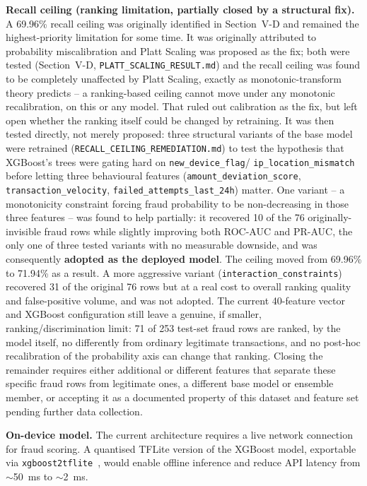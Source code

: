 \documentclass[conference]{IEEEtran}
\begin{document}
\textbf{Recall ceiling (ranking limitation, partially closed by a structural
fix).} A 69.96\% recall ceiling was originally identified in Section~V-D and
remained the highest-priority limitation for some time. It was originally
attributed to probability miscalibration and Platt Scaling was proposed as
the fix; both were tested (Section~V-D, \texttt{PLATT\_SCALING\_RESULT.md})
and the recall ceiling was found to be completely unaffected by Platt
Scaling, exactly as monotonic-transform theory predicts -- a ranking-based
ceiling cannot move under any monotonic recalibration, on this or any
model. That ruled out calibration as the fix, but left open whether the
ranking itself could be changed by retraining. It was then tested directly,
not merely proposed: three structural variants of the base model were
retrained (\texttt{RECALL\_CEILING\_REMEDIATION.md}) to test the hypothesis
that XGBoost's trees were gating hard on \texttt{new\_device\_flag}/
\texttt{ip\_location\_mismatch} before letting three behavioural features
(\texttt{amount\_deviation\_score}, \texttt{transaction\_velocity},
\texttt{failed\_attempts\_last\_24h}) matter. One variant -- a monotonicity
constraint forcing fraud probability to be non-decreasing in those three
features -- was found to help partially: it recovered 10 of the 76
originally-invisible fraud rows while slightly improving both ROC-AUC and
PR-AUC, the only one of three tested variants with no measurable downside,
and was consequently \textbf{adopted as the deployed model}. The ceiling
moved from 69.96\% to 71.94\% as a result. A more aggressive variant
(\texttt{interaction\_constraints}) recovered 31 of the original 76 rows but
at a real cost to overall ranking quality and false-positive volume, and was
not adopted. The current 40-feature vector and XGBoost configuration still
leave a genuine, if smaller, ranking/discrimination limit: 71 of 253
test-set fraud rows are ranked, by the model itself, no differently from
ordinary legitimate transactions, and no post-hoc recalibration of the
probability axis can change that ranking. Closing the remainder requires
either additional or different features that separate these specific fraud
rows from legitimate ones, a different base model or ensemble member, or
accepting it as a documented property of this dataset and feature set
pending further data collection.

\textbf{On-device model.} The current architecture requires a live network
connection for fraud scoring. A quantised TFLite version of the XGBoost
model, exportable via \texttt{xgboost2tflite}~\cite{tflite2024}, would
enable offline inference and reduce API latency from $\sim$50~ms to
$\sim$2~ms.
\end{document}
